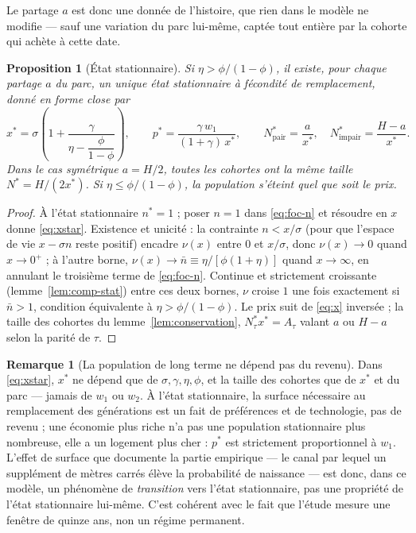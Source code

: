 \documentclass[11pt,a4paper]{article}
\theoremstyle{plain}
\newtheorem{proposition}{Proposition}
\theoremstyle{definition}
\newtheorem{remarque}{Remarque}
\begin{document}
Le partage $a$ est donc une donnée de l'histoire, que rien dans le modèle ne modifie — sauf une variation du parc lui-même, captée tout entière par la cohorte qui achète à cette date.

\begin{proposition}[État stationnaire]\label{prop:ss}
Si $\eta > \phi/(1-\phi)$, il existe, pour chaque partage $a$ du parc, un unique état stationnaire à fécondité de remplacement, donné en forme close par
\begin{equation}\label{eq:xstar}
x^* = \sigma\left(1 + \frac{\gamma}{\eta - \dfrac{\phi}{1-\phi}}\right) ,
\qquad
p^* = \frac{\gamma\, w_1}{(1+\gamma)\, x^*} ,
\qquad
N^*_{\text{pair}} = \frac{a}{x^*} , \quad N^*_{\text{impair}} = \frac{H-a}{x^*} .
\end{equation}
Dans le cas symétrique $a = H/2$, toutes les cohortes ont la même taille $N^* = H/(2x^*)$. Si $\eta \leq \phi/(1-\phi)$, la population s'éteint quel que soit le prix.
\end{proposition}
\begin{proof}
À l'état stationnaire $n^*=1$ ; poser $n=1$ dans \eqref{eq:foc-n} et résoudre en $x$ donne \eqref{eq:xstar}. Existence et unicité : la contrainte $n < x/\sigma$ (pour que l'espace de vie $x-\sigma n$ reste positif) encadre $\nu(x)$ entre $0$ et $x/\sigma$, donc $\nu(x) \to 0$ quand $x \to 0^+$ ; à l'autre borne, $\nu(x) \to \bar n \equiv \eta/[\phi(1+\eta)]$ quand $x \to \infty$, en annulant le troisième terme de \eqref{eq:foc-n}. Continue et strictement croissante (lemme~\ref{lem:comp-stat}) entre ces deux bornes, $\nu$ croise $1$ une fois exactement si $\bar n > 1$, condition équivalente à $\eta > \phi/(1-\phi)$. Le prix suit de \eqref{eq:x} inversée ; la taille des cohortes du lemme~\ref{lem:conservation}, $N^*_\tau x^* = A_\tau$ valant $a$ ou $H-a$ selon la parité de $\tau$.
\end{proof}

\begin{remarque}[La population de long terme ne dépend pas du revenu]\label{rem:neutralite}
Dans \eqref{eq:xstar}, $x^*$ ne dépend que de $\sigma, \gamma, \eta, \phi$, et la taille des cohortes que de $x^*$ et du parc — jamais de $w_1$ ou $w_2$. À l'état stationnaire, la surface nécessaire au remplacement des générations est un fait de préférences et de technologie, pas de revenu ; une économie plus riche n'a pas une population stationnaire plus nombreuse, elle a un logement plus cher : $p^*$ est strictement proportionnel à $w_1$. L'effet de surface que documente la partie empirique — le canal par lequel un supplément de mètres carrés élève la probabilité de naissance — est donc, dans ce modèle, un phénomène de \emph{transition} vers l'état stationnaire, pas une propriété de l'état stationnaire lui-même. C'est cohérent avec le fait que l'étude mesure une fenêtre de quinze ans, non un régime permanent.
\end{remarque}
\end{document}
